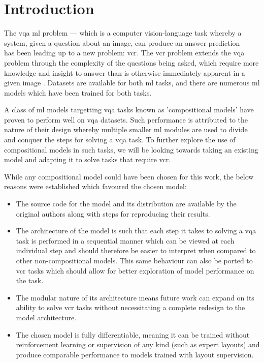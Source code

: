 \chapter{Introduction}
\label{chp:introduction}

The \acrlong{vqa} \gls{ml} problem --- which is a computer vision-language task whereby a system, given a question about an image, can produce an answer prediction \cite{agrawal_vqa_2016} --- has been leading up to a new problem: \acrfull{vcr}.
The \acrshort{vcr} problem extends the \acrshort{vqa} problem through the complexity of the questions being asked, which require more knowledge and insight to answer than is otherwise immediately apparent in a given image \cite{zellers_recognition_2019}.
Datasets are available for both \gls{ml} tasks, and there are numerous \gls{ml} models which have been trained for both tasks.

A class of \gls{ml} models targetting \gls{vqa} tasks known as 'compositional models'\cite{andreas_neural_2016} have proven to perform well on \gls{vqa} datasets\cite{fishandi_neural_2023}.
Such performance is attributed to the nature of their design whereby multiple smaller \gls{ml} modules are used to divide and conquer the steps for solving a \gls{vqa} task.
To further explore the use of compositional models in such tasks, we will be looking towards taking an existing model and adapting it to solve tasks that require \gls{vcr}.

While any compositional model could have been chosen for this work, the below reasons were established which favoured the chosen model:

\begin{itemize}\label{list:reasons_for_nmn}
    \item The source code for the model and its distribution are available by the original authors along with steps for reproducing their results.
    \item The architecture of the model is such that each step it takes to solving a \gls{vqa} task is performed in a sequential manner which can be viewed at each individual step and should therefore be easier to interpret when compared to other non-compositional models.
          This same behaviour can also be ported to \gls{vcr} tasks which should allow for better exploration of model performance on the task.
    \item The modular nature of its architecture means future work can expand on its ability to solve \gls{vcr} tasks without necessitating a complete redesign to the model architecture.
    \item The chosen model is fully differentiable, meaning it can be trained without reinforcement learning or supervision of any kind (such as expert layouts) and produce comparable performance to models trained with layout supervision.
\end{itemize}

